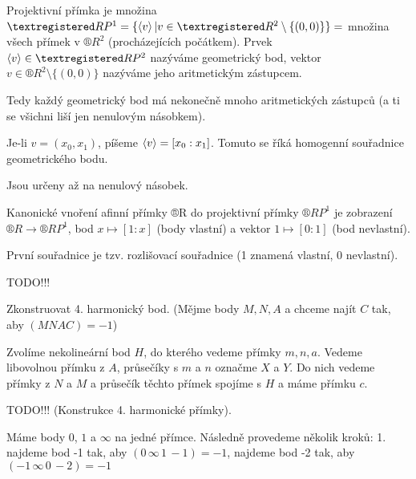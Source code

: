 \documentclass[12pt]{article}					%
\begin{document}
\begin{definice}
	Projektivní přímka je množina $®RP^1 = \{\<v\> | v \in ®R^2 \setminus \{(0, 0)\}\} =$ množina všech přímek v $®R^2$ (procházejících počátkem). Prvek $\<v\> \in ®RP^2$ nazýváme geometrický bod, vektor $v \in ®R^2 \setminus \{(0, 0)\}$ nazýváme jeho aritmetickým zástupcem.

	\begin{poznamkain}
		Tedy každý geometrický bod má nekonečně mnoho aritmetických zástupců (a ti se všichni liší jen nenulovým násobkem).
	\end{poznamkain}

	Je-li $v = (x_0, x_1)$, píšeme $\left\langle v\right\rangle = [x_0:x_1]$. Tomuto se říká homogenní souřadnice geometrického bodu.

	\begin{poznamkain}
		Jsou určeny až na nenulový násobek.
	\end{poznamkain}
\end{definice}

\begin{definice}
	Kanonické vnoření afinní přímky ®R do projektivní přímky $®RP^1$ je zobrazení $®R \rightarrow ®RP^1$, bod $x \mapsto [1:x]$ (body vlastní) a vektor $1 \mapsto [0:1]$ (bod nevlastní).

	První souřadnice je tzv. rozlišovací souřadnice (1 znamená vlastní, 0 nevlastní).
\end{definice}


TODO!!!

\begin{priklad}[Konstrukce]
	Zkonstruovat 4. harmonický bod. (Mějme body $M, N, A$ a chceme najít $C$ tak, aby $(MNAC) = -1$)

	\begin{reseni}
		Zvolíme nekolineární bod $H$, do kterého vedeme přímky $m, n, a$. Vedeme libovolnou přímku z $A$, průsečíky s $m$ a $n$ označme $X$ a $Y$. Do nich vedeme přímky z $N$ a $M$ a průsečík těchto přímek spojíme s $H$ a máme přímku $c$.
	\end{reseni}
\end{priklad}

TODO!!! (Konstrukce 4. harmonické přímky).


\begin{definice}
	Máme body $0$, $1$ a $∞$ na jedné přímce. Následně provedeme několik kroků: 1. najdeme bod -1 tak, aby $(0\, ∞\, 1\, -1) = -1$, najdeme bod -2 tak, aby $(-1\, ∞\, 0\, -2) = -1$
\end{definice}
\end{document}
